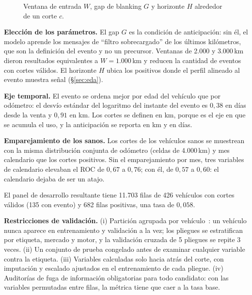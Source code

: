 \begin{figure}[!htbp]
\centering
{}
\caption{Ventana de entrada $W$, gap de blanking $G$ y horizonte $H$ alrededor de un corte $c$.}
\label{fig:panel}
\end{figure}

\textbf{Elección de los parámetros.} El gap $G$ es la condición de anticipación: sin él, el modelo aprende los mensajes de
``filtro sobrecargado'' de los últimos kilómetros, que son la definición del evento y no un precursor. Ventanas de 2.000 y
3.000\,km dieron resultados equivalentes a $W = 1.000$\,km y reducen la cantidad de eventos con cortes válidos. El horizonte
$H$ ubica los positivos donde el perfil alineado al evento muestra señal (\S\ref{sec:eda}).

\textbf{Eje temporal.} El evento se ordena mejor por edad del vehículo que por odómetro: el desvío estándar del logaritmo
del instante del evento es $0{,}38$ en días desde la venta y $0{,}91$ en km. Los cortes se definen en km, porque es el eje en
que se acumula el uso, y la anticipación se reporta en km y en días.

\textbf{Emparejamiento de los sanos.} Los cortes de los vehículos sanos se muestrean con la misma distribución conjunta
de odómetro (celdas de 4.000\,km) y mes calendario que los cortes positivos. Sin el emparejamiento por mes, tres variables
de calendario elevaban el ROC de $0{,}67$ a $0{,}76$; con él, de $0{,}57$ a $0{,}60$: el calendario dejaba de ser un atajo.

El panel de desarrollo resultante tiene 11.703 filas de 426 vehículos con cortes válidos (135 con evento) y 682 filas
positivas, una tasa de $0{,}058$.

\textbf{Restricciones de validación.} (i) Partición agrupada por vehículo~\cite{roberts2017}: un vehículo nunca aparece en
entrenamiento y validación a la vez; los pliegues se estratifican por etiqueta, mercado y motor, y la validación cruzada de
5 pliegues se repite 3 veces. (ii) Un conjunto de prueba congelado antes de examinar cualquier variable contra la etiqueta.
(iii) Variables calculadas solo hacia atrás del corte, con imputación y escalado ajustados en el entrenamiento de cada
pliegue. (iv) Auditorías de fuga de información obligatorias para todo candidato: con las variables permutadas entre filas, la
métrica tiene que caer a la tasa base.


